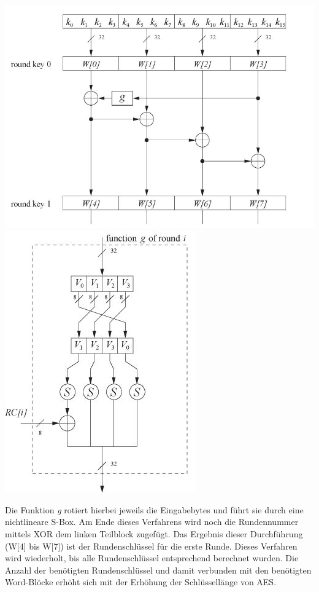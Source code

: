 \documentclass[10pt, a4paper,headsepline]{scrreprt}
\begin{document}
\includegraphics[scale=0.4]{key_sched_1_round.JPG} 
\includegraphics[scale=0.55]{aes_key_sched_function_g.JPG}
\hfill

Die Funktion \textit{g} rotiert hierbei jeweils die Eingabebytes und führt sie durch eine nichtlineare S-Box. Am Ende dieses Verfahrens wird noch die Rundennummer mittels XOR dem linken Teilblock zugefügt. Das Ergebnis dieser Durchführung (W[4] bis W[7]) ist der Rundenschlüssel für die erste Runde. Dieses Verfahren wird wiederholt, bis alle Rundenschlüssel entsprechend berechnet wurden. Die Anzahl der benötigten Rundenschlüssel und damit verbunden mit den benötigten Word-Blöcke erhöht sich mit der Erhöhung der Schlüssellänge von AES.
\end{document}
